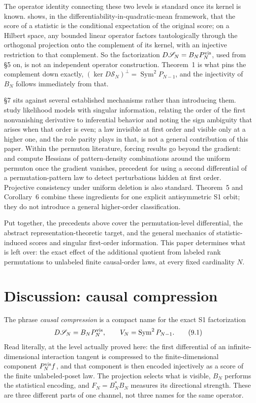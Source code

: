 \documentclass[11pt]{article}
\begin{document}
The operator identity connecting these two levels is standard once its kernel is known. \citet{Pollard2013} shows, in the differentiability-in-quadratic-mean framework, that the score of a statistic is the conditional expectation of the original score; on a Hilbert space, any bounded linear operator factors tautologically through the orthogonal projection onto the complement of its kernel, with an injective restriction to that complement. So the factorization $D\mathscr S_N=B_NP_N^{\rm vis}$, used from \S5 on, is not an independent operator construction. Theorem~1 is what pins the complement down exactly, $(\ker D\mathscr S_N)^\perp=\operatorname{Sym}^2P_{N-1}$, and the injectivity of $B_N$ follows immediately from that.

\S7 sits against several established mechanisms rather than introducing them. \citet{RotnitzkyCoxBottaiRobins2000} study likelihood models with singular information, relating the order of the first nonvanishing derivative to inferential behavior and noting the sign ambiguity that arises when that order is even; a law invisible at first order and visible only at a higher one, and the role parity plays in that, is not a general contribution of this paper. Within the permuton literature, forcing results go beyond the gradient: \citet{Chan2021} and \citet{CrudeleDukesNoel2024} compute Hessians of pattern-density combinations around the uniform permuton once the gradient vanishes, precedent for using a second differential of a permutation-pattern law to detect perturbations hidden at first order. Projective consistency under uniform deletion is also standard. Theorem~5 and Corollary~6 combine these ingredients for one explicit antisymmetric S1 orbit; they do not introduce a general higher-order classification.

Put together, the precedents above cover the permutation-level differential, the abstract representation-theoretic target, and the general mechanics of statistic-induced scores and singular first-order information. This paper determines what is left over: the exact effect of the additional quotient from labeled rank permutations to unlabeled finite causal-order laws, at every fixed cardinality $N$.

\section{Discussion: causal compression}

The phrase \emph{causal compression} is a compact name for the exact S1 factorization \[ D\mathscr S_N=B_NP_N^{\rm vis}, \qquad V_N=\operatorname{Sym}^2P_{N-1}. \tag{9.1} \] Read literally, at the level actually proved here: the first differential of an infinite-dimensional interaction tangent is compressed to the finite-dimensional component \(P_N^{\rm vis}f\), and that component is then encoded injectively as a score of the finite unlabeled-poset law. The projection selects what is visible, \(B_N\) performs the statistical encoding, and \(F_N=B_N^*B_N\) measures its directional strength. These are three different parts of one channel, not three names for the same operator.
\end{document}
